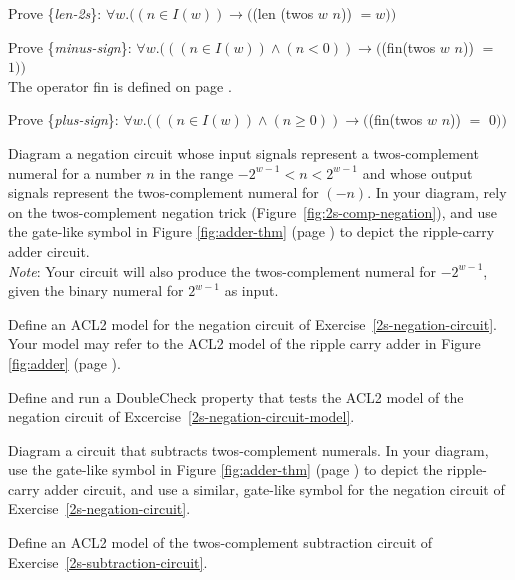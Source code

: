 \begin{ExerciseList}

\Exercise \label{len-2s}
Prove \{\emph{len-2s}\}:
$\forall w.((n \in I(w)) \rightarrow ($\textsf{(len (twos $w$ $n$))} $= w))$

\Exercise \label{minus-sign}
Prove \{\emph{minus-sign}\}:
$\forall w.(((n \in I(w)) \wedge (n < 0)) \rightarrow ($\textsf{(fin(twos $w$ $n$))} $=$ $1))$\\
The operator \textsf{fin} is defined on page \pageref{fin-defun}.

\Exercise \label{plus-sign}
Prove \{\emph{plus-sign}\}:
$\forall w.(((n \in I(w)) \wedge (n \geq 0)) \rightarrow ($\textsf{(fin(twos $w$ $n$))} $=$ $0))$

\Exercise \label{2s-negation-circuit}
Diagram a negation circuit whose input signals represent a
twos-complement numeral for a number $n$ in the range 
$-2^{w-1} < n < 2^{w-1}$
and whose output signals represent 
the twos-complement numeral for $(-n)$.
In your diagram, rely on the twos-complement negation trick
(Figure~\ref{fig:2s-comp-negation}),
and use the gate-like symbol in
Figure \ref{fig:adder-thm} (page \pageref{fig:adder-thm})
to depict the ripple-carry adder circuit.\\
\emph{Note}: Your circuit will also produce the twos-complement
numeral for $-2^{w-1}$, given the binary numeral for $2^{w-1}$
as input.

\Exercise \label{2s-negation-circuit-model}
Define an ACL2 model for the negation circuit
of Exercise~\ref{2s-negation-circuit}.
Your model may refer to the ACL2 model
of the ripple carry adder in
Figure \ref{fig:adder} (page \pageref{fig:adder}).

\Exercise Define and run a DoubleCheck property that
tests the ACL2 model of the negation circuit of
Excercise~\ref{2s-negation-circuit-model}.

\Exercise \label{2s-subtraction-circuit}
Diagram a circuit that subtracts twos-complement numerals.
In your diagram, use the gate-like symbol in
Figure \ref{fig:adder-thm} (page \pageref{fig:adder-thm})
to depict the ripple-carry adder circuit,
and use a similar, gate-like symbol for the negation circuit
of Exercise~\ref{2s-negation-circuit}.

\Exercise \label{2s-subtraction-circuit-model}
Define an ACL2 model of the twos-complement
subtraction circuit of Exercise~\ref{2s-subtraction-circuit}.


\end{ExerciseList}
